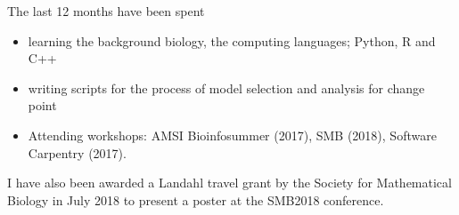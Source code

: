 The last 12 months have been spent 
    \begin{itemize}
        \item learning the background biology, the computing languages; Python, R and C++
        \item writing scripts for the process of model selection and analysis for change point
        \item Attending workshops: AMSI Bioinfosummer (2017), SMB (2018), Software Carpentry (2017).
    \end{itemize}

I have also been awarded a Landahl travel grant by the Society for Mathematical Biology in July 2018 to present a poster at the SMB2018 conference.